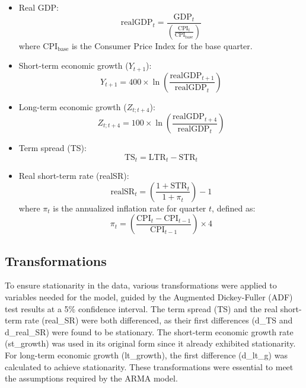 \documentclass[12pt]{article}
\begin{document}
\begin{itemize}
    \item Real GDP:
    \begin{equation}
    \text{realGDP}_t = \frac{\text{GDP}_t}{\left(\frac{\text{CPI}_t}{\text{CPI}_{\text{base}}}\right)}
    \end{equation}
    where CPI\(_{\text{base}}\) is the Consumer Price Index for the base quarter.

    \item Short-term economic growth (\(Y_{t+1}\)):
    \begin{equation}
    Y_{t+1} = 400 \times \ln\left(\frac{\text{realGDP}_{t+1}}{\text{realGDP}_t}\right)
    \end{equation}

    \item Long-term economic growth (\(Z_{t;t+4}\)):
    \begin{equation}
    Z_{t;t+4} = 100 \times \ln\left(\frac{\text{realGDP}_{t+4}}{\text{realGDP}_t}\right)
    \end{equation}

    \item Term spread (TS):
    \begin{equation}
    \text{TS}_t = \text{LTR}_t - \text{STR}_t
    \end{equation}

    \item Real short-term rate (realSR):
    \begin{equation}
    \text{realSR}_t = \left(\frac{1 + \text{STR}_t}{1 + \pi_t}\right) - 1
    \end{equation}
    where \(\pi_t\) is the annualized inflation rate for quarter \(t\), defined as:
    \begin{equation}
    \pi_t = \left(\frac{\text{CPI}_t - \text{CPI}_{t-1}}{\text{CPI}_{t-1}}\right) \times 4
    \end{equation}
\end{itemize}


\subsection{Transformations}

To ensure stationarity in the data, various transformations were applied to variables needed for the model, guided by the Augmented Dickey-Fuller (ADF) test results at a 5\% confidence interval. The term spread (TS) and the real short-term rate (real\_SR) were both differenced, as their first differences (d\_TS and d\_real\_SR) were found to be stationary. The short-term economic growth rate (st\_growth) was used in its original form since it already exhibited stationarity. For long-term economic growth (lt\_growth), the first difference (d\_lt\_g) was calculated to achieve stationarity.
These transformations were essential to meet the assumptions required by the ARMA model.
\end{document}
